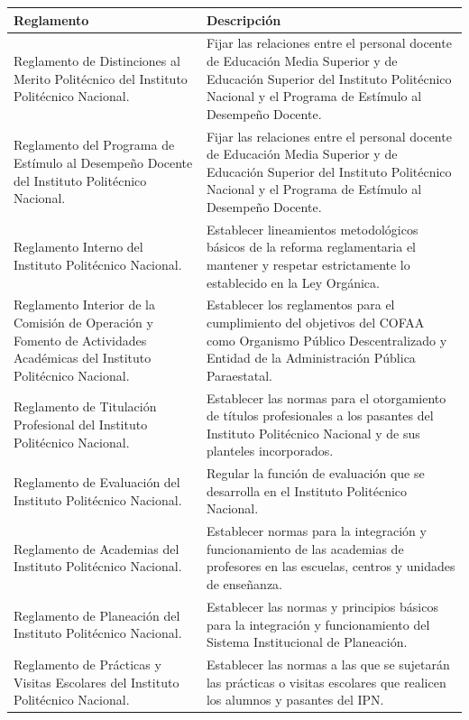 \begin{tabular}{ | m{17em} | m{25em}|}
    \hline
    \textbf{Reglamento} & \textbf{Descripción} \\
    \hline
    Reglamento de Distinciones al Merito Politécnico del Instituto Politécnico Nacional. &  Fijar las relaciones entre el personal docente de Educación Media Superior y de Educación Superior del Instituto Politécnico Nacional y el Programa de Estímulo al Desempeño Docente. \\
    \hline
    Reglamento del Programa de Estímulo al Desempeño Docente del Instituto Politécnico Nacional. & Fijar las relaciones entre el personal docente de Educación Media Superior y de Educación Superior del Instituto Politécnico Nacional y el Programa de Estímulo al Desempeño Docente. \\
    \hline
    Reglamento Interno del Instituto Politécnico Nacional. & Establecer lineamientos metodológicos básicos de la reforma reglamentaria el mantener y respetar estrictamente lo establecido en la Ley Orgánica. \\
    \hline
    Reglamento Interior de la Comisión de Operación y Fomento de Actividades Académicas del Instituto Politécnico Nacional. & Establecer los reglamentos  para el cumplimiento del objetivos del COFAA como Organismo Público Descentralizado y Entidad  de  la  Administración  Pública  Paraestatal. \\
    \hline
    Reglamento de Titulación Profesional del Instituto Politécnico Nacional. & Establecer las normas para el otorgamiento de títulos profesionales a los pasantes del Instituto Politécnico Nacional y de sus planteles incorporados.  \\
    \hline
    Reglamento de Evaluación del Instituto Politécnico Nacional. & Regular  la  función  de  evaluación  que  se  desarrolla  en  el  Instituto  Politécnico  Nacional. \\
    \hline
    Reglamento de Academias del Instituto Politécnico Nacional. & Establecer normas para la integración y funcionamiento de las academias de profesores en las escuelas,  centros y unidades de enseñanza. \\
    \hline
    Reglamento de Planeación del Instituto Politécnico Nacional. & Establecer las normas y principios básicos para la integración y funcionamiento del Sistema Institucional de Planeación. \\
    \hline
    Reglamento de Prácticas y Visitas Escolares del Instituto Politécnico Nacional. & Establecer las normas a las que se sujetarán las prácticas o visitas escolares que realicen los alumnos y pasantes del IPN. \\

\end{tabular}
